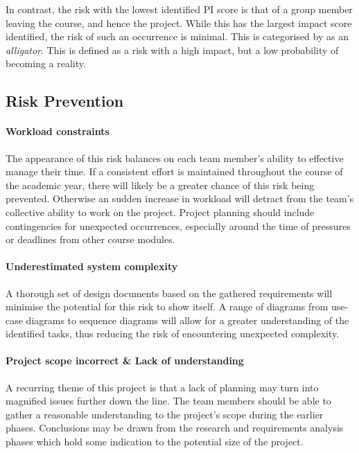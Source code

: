 In contrast, the risk with the lowest identified PI score is that of a group
member leaving the course, and hence the project. While this has the largest
impact score identified, the risk of such an occurrence is minimal. This is
categorised by \citet{stoeller03} as an \emph{alligator}. This is defined as a
risk with a high impact, but a low probability of becoming a reality.

\subsection{Risk Prevention}

\paragraph{Workload constraints}
The appearance of this risk balances on each team member's ability to effective
manage their time. If a consistent effort is maintained throughout the course of
the academic year, there will likely be a greater chance of this risk being
prevented. Otherwise an sudden increase in workload will detract from the team's
collective ability to work on the project. Project planning should include
contingencies for unexpected occurrences, especially around the time of
pressures or deadlines from other course modules.

\paragraph{Underestimated system complexity}
A thorough set of design documents based on the gathered requirements will
minimise the potential for this risk to show itself. A range of diagrams from
use-case diagrams to sequence diagrams will allow for a greater understanding of
the identified tasks, thus reducing the risk of encountering unexpected
complexity.

\paragraph{Project scope incorrect \& Lack of understanding} 
A recurring theme of this project is that a lack of planning may turn into
magnified issues further down the line. The team members should be able to
gather a reasonable understanding to the project's scope during the earlier
phases. Conclusions may be drawn from the research and requirements analysis
phases which hold some indication to the potential size of the project.

